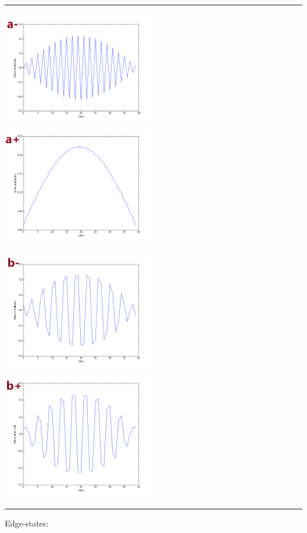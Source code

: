 \documentclass[letterpaper,10pt,english]{sphinxmanual}
\begin{document}
\bigskip\hrule{}\bigskip


\includegraphics[width=0.5\textwidth]{a-.png} \includegraphics[width=0.5\textwidth]{a+.png}

\includegraphics[width=0.5\textwidth]{b-.png} \includegraphics[width=0.5\textwidth]{b+.png}


\bigskip\hrule{}\bigskip


Edge-states: 
\end{document}
